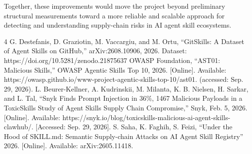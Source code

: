 \documentclass[sigconf,review]{acmart}
\begin{document}
Together, these improvements would move the project beyond preliminary structural measurements toward a more reliable and scalable approach for detecting and understanding supply-chain risks in AI agent skill ecosystems.


\begin{thebibliography}{4}
 G. Destefanis, D. Graziotin, M. Vaccargiu, and M. Ortu, “GitSkills: A Dataset of Agent Skills on GitHub,” arXiv:2608.10906, 2026. Dataset: https://doi.org/10.5281/zenodo.21875637
 OWASP Foundation, “AST01: Malicious Skills,” OWASP Agentic Skills Top 10, 2026. [Online]. Available: https://owasp.github.io/www-project-agentic-skills-top-10/ast01. (accessed: Sep. 29, 2026).
 L. Beurer-Kellner, A. Kudrinskii, M. Milanta, K. B. Nielsen, H. Sarkar, and L. Tal, “Snyk Finds Prompt Injection in 36\%, 1467 Malicious Payloads in a ToxicSkills Study of Agent Skills Supply Chain Compromise,” Snyk, Feb. 5, 2026. [Online]. Available: https://snyk.io/blog/toxicskills-malicious-ai-agent-skills-clawhub/. [Accessed: Sep. 29, 2026].
 S. Saha, K. Faghih, S. Feizi, “Under the Hood of SKILL.md: Semantic Supply-chain Attacks on AI Agent Skill Registry” 2026. [Online]. Available: arXiv:2605.11418.
\end{thebibliography}
\end{document}
